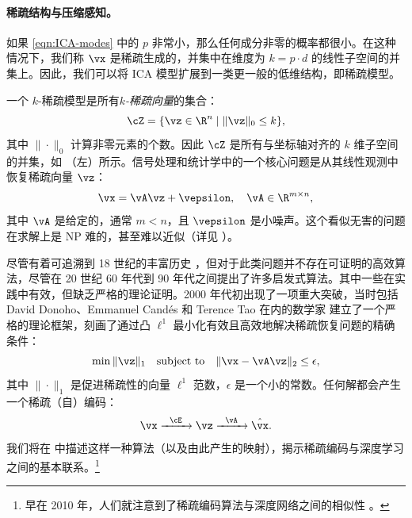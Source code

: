 \documentclass[../../book-main_zh.tex]{subfiles}
\begin{document}
\paragraph{稀疏结构与压缩感知。}
如果 \eqref{eqn:ICA-modes} 中的 \(p\) 非常小，那么任何成分非零的概率都很小。在这种情况下，我们称
\(\vx\) 是稀疏生成的，并集中在维度为 \(k = p \cdot d\) 的线性子空间的并集上。因此，我们可以将 ICA
模型扩展到一类更一般的低维结构，即稀疏模型。

一个 \(k\)-稀疏模型是所有\textit{\(k\)-稀疏向量}的集合：
\begin{equation}
    \cZ = \{\vz \in \R^{n} \mid \|\vz\|_{0} \leq k\},
\end{equation}
其中 \(\|\cdot\|_{0}\) 计算非零元素的个数。因此 \(\cZ\) 是所有与坐标轴对齐的 \(k\) 维子空间的并集，如
（左）所示。信号处理和统计学中的一个核心问题是从其线性观测中恢复稀疏向量 \(\vz\)：
\begin{equation}
    \vx = \vA \vz + \vepsilon, \quad \vA \in \R^{m\times n},
    \label{eqn:sparse-model}
\end{equation}
其中 \(\vA\) 是给定的，通常 \(m < n\)，且 \(\vepsilon\) 是小噪声。这个看似无害的问题在求解上是 NP
难的，甚至难以近似（详见 \cite{Wright-Ma-2022}）。

尽管有着可追溯到 18 世纪的丰富历史 \cite{Boscovichca1750}，但对于此类问题并不存在可证明的高效算法，尽管在 20
世纪 60 年代到 90 年代之间提出了许多启发式算法。其中一些在实践中有效，但缺乏严格的理论证明。2000
年代初出现了一项重大突破，当时包括 David Donoho、Emmanuel Cand\'{e}s 和 Terence Tao
在内的数学家 \cite{donoho2005neighborly,Candes2005,CandesE2005-IT}
建立了一个严格的理论框架，刻画了通过凸 \(\ell^{1}\) 最小化有效且高效地解决稀疏恢复问题的精确条件：
\begin{equation}
    \min \|\vz\|_{1} \quad \text{subject to} \quad \|\vx -
    \vA\vz\|_{2} \leq \epsilon,
\end{equation}
其中 \(\|\cdot\|_{1}\) 是促进稀疏性的向量 \(\ell^{1}\) 范数，\(\epsilon\)
是一个小的常数。任何解都会产生一个稀疏（自）编码：
\begin{equation}
    \vx \xrightarrow{\hspace{2mm} \cE \hspace{2mm}} \vz
    \xrightarrow{\hspace{2mm} \vA \hspace{2mm}} \hat{\vx}.
    \label{eqn:decoding-sparse}
\end{equation}
我们将在 
中描述这样一种算法（以及由此产生的映射），揭示稀疏编码与深度学习之间的基本联系。\footnote{早在 2010
年，人们就注意到了稀疏编码算法与深度网络之间的相似性 \cite{gregor2010learning}。}
\end{document}
